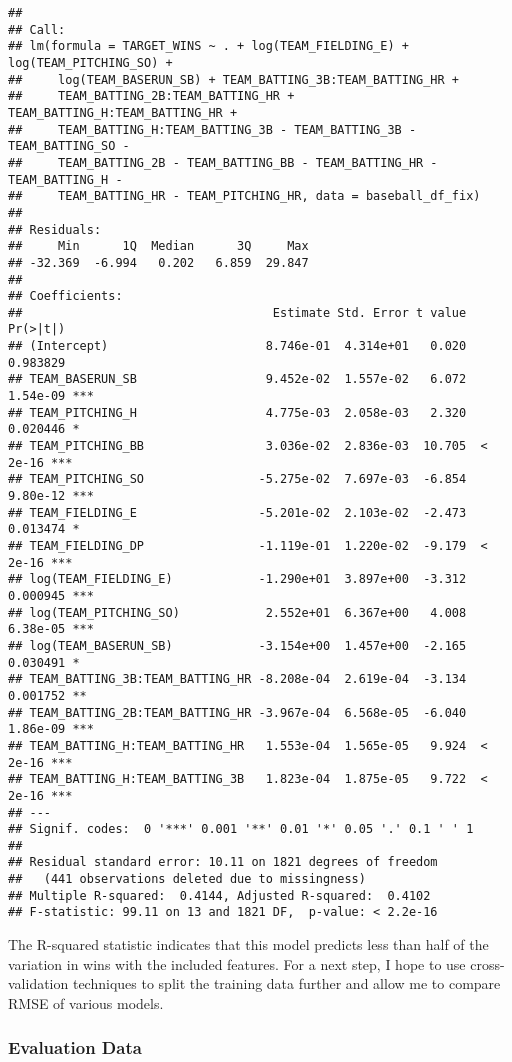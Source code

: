 \documentclass[
]{article}
\begin{document}
\begin{verbatim}
## 
## Call:
## lm(formula = TARGET_WINS ~ . + log(TEAM_FIELDING_E) + log(TEAM_PITCHING_SO) + 
##     log(TEAM_BASERUN_SB) + TEAM_BATTING_3B:TEAM_BATTING_HR + 
##     TEAM_BATTING_2B:TEAM_BATTING_HR + TEAM_BATTING_H:TEAM_BATTING_HR + 
##     TEAM_BATTING_H:TEAM_BATTING_3B - TEAM_BATTING_3B - TEAM_BATTING_SO - 
##     TEAM_BATTING_2B - TEAM_BATTING_BB - TEAM_BATTING_HR - TEAM_BATTING_H - 
##     TEAM_BATTING_HR - TEAM_PITCHING_HR, data = baseball_df_fix)
## 
## Residuals:
##     Min      1Q  Median      3Q     Max 
## -32.369  -6.994   0.202   6.859  29.847 
## 
## Coefficients:
##                                   Estimate Std. Error t value Pr(>|t|)    
## (Intercept)                      8.746e-01  4.314e+01   0.020 0.983829    
## TEAM_BASERUN_SB                  9.452e-02  1.557e-02   6.072 1.54e-09 ***
## TEAM_PITCHING_H                  4.775e-03  2.058e-03   2.320 0.020446 *  
## TEAM_PITCHING_BB                 3.036e-02  2.836e-03  10.705  < 2e-16 ***
## TEAM_PITCHING_SO                -5.275e-02  7.697e-03  -6.854 9.80e-12 ***
## TEAM_FIELDING_E                 -5.201e-02  2.103e-02  -2.473 0.013474 *  
## TEAM_FIELDING_DP                -1.119e-01  1.220e-02  -9.179  < 2e-16 ***
## log(TEAM_FIELDING_E)            -1.290e+01  3.897e+00  -3.312 0.000945 ***
## log(TEAM_PITCHING_SO)            2.552e+01  6.367e+00   4.008 6.38e-05 ***
## log(TEAM_BASERUN_SB)            -3.154e+00  1.457e+00  -2.165 0.030491 *  
## TEAM_BATTING_3B:TEAM_BATTING_HR -8.208e-04  2.619e-04  -3.134 0.001752 ** 
## TEAM_BATTING_2B:TEAM_BATTING_HR -3.967e-04  6.568e-05  -6.040 1.86e-09 ***
## TEAM_BATTING_H:TEAM_BATTING_HR   1.553e-04  1.565e-05   9.924  < 2e-16 ***
## TEAM_BATTING_H:TEAM_BATTING_3B   1.823e-04  1.875e-05   9.722  < 2e-16 ***
## ---
## Signif. codes:  0 '***' 0.001 '**' 0.01 '*' 0.05 '.' 0.1 ' ' 1
## 
## Residual standard error: 10.11 on 1821 degrees of freedom
##   (441 observations deleted due to missingness)
## Multiple R-squared:  0.4144, Adjusted R-squared:  0.4102 
## F-statistic: 99.11 on 13 and 1821 DF,  p-value: < 2.2e-16
\end{verbatim}

The R-squared statistic indicates that this model predicts less than
half of the variation in wins with the included features. For a next
step, I hope to use cross-validation techniques to split the training
data further and allow me to compare RMSE of various models.

\hypertarget{evaluation-data}{%
\subsubsection{Evaluation Data}\label{evaluation-data}}
\end{document}
